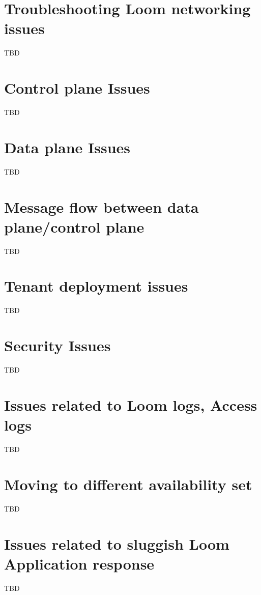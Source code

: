 \documentclass[letterpaper,10pt,english]{sphinxmanual}
\begin{document}
\section{Troubleshooting Loom networking issues}
\label{\detokenize{loom_installation_guide:troubleshooting-loom-networking-issues}}
TBD


\section{Control plane Issues}
\label{\detokenize{loom_installation_guide:control-plane-issues}}
TBD


\section{Data plane Issues}
\label{\detokenize{loom_installation_guide:data-plane-issues}}
TBD


\section{Message flow between data plane/control plane}
\label{\detokenize{loom_installation_guide:message-flow-between-data-plane-control-plane}}
TBD


\section{Tenant deployment issues}
\label{\detokenize{loom_installation_guide:tenant-deployment-issues}}
TBD


\section{Security Issues}
\label{\detokenize{loom_installation_guide:security-issues}}
TBD


\section{Issues related to Loom logs, Access logs}
\label{\detokenize{loom_installation_guide:issues-related-to-loom-logs-access-logs}}
TBD


\section{Moving to different availability set}
\label{\detokenize{loom_installation_guide:moving-to-different-availability-set}}
TBD


\section{Issues related to sluggish Loom Application response}
\label{\detokenize{loom_installation_guide:issues-related-to-sluggish-loom-application-response}}
TBD
\end{document}
